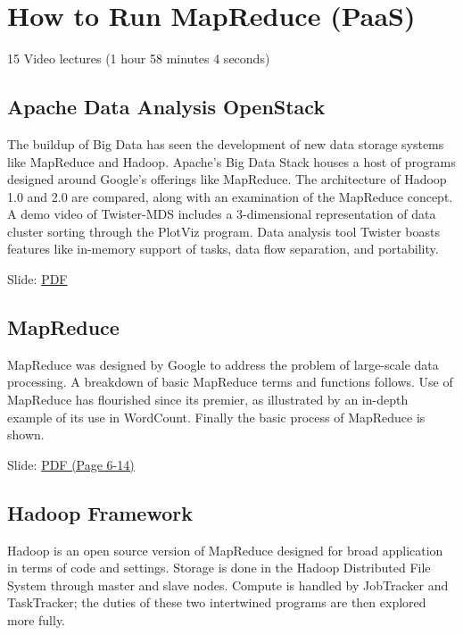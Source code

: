 \section{How to Run MapReduce (PaaS)}

  15 Video lectures (1 hour 58 minutes 4 seconds)

\subsection{Apache Data Analysis OpenStack}

The buildup of Big Data has seen the development of new data storage
systems like MapReduce and Hadoop. Apache's Big Data Stack houses a host
of programs designed around Google's offerings like MapReduce. The
architecture of Hadoop 1.0 and 2.0 are compared, along with an
examination of the MapReduce concept. A demo video of Twister-MDS
includes a 3-dimensional representation of data cluster sorting through
the PlotViz program. Data analysis tool Twister boasts features like
in-memory support of tasks, data flow separation, and portability.


  Slide:
  \href{https://drive.google.com/open?id=0B88HKpainTSfMnpCelpNQUpNdVE}{PDF}

\subsection{MapReduce}

MapReduce was designed by Google to address the problem of large-scale
data processing. A breakdown of basic MapReduce terms and functions
follows. Use of MapReduce has flourished since its premier, as
illustrated by an in-depth example of its use in WordCount. Finally the
basic process of MapReduce is shown.


  Slide:
  \href{https://drive.google.com/open?id=0B88HKpainTSfMnpCelpNQUpNdVE}{PDF
  (Page 6-14)}

\subsection{Hadoop Framework}

Hadoop is an open source version of MapReduce designed for broad
application in terms of code and settings. Storage is done in the Hadoop
Distributed File System through master and slave nodes. Compute is
handled by JobTracker and TaskTracker; the duties of these two
intertwined programs are then explored more fully.

